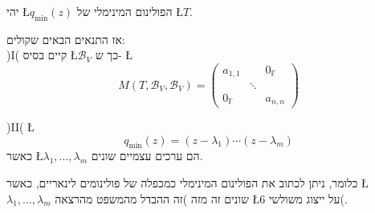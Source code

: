 \documentclass[english,hebrew]{article}
\begin{document}
יהי \L{$q_{\min}(z)$} הפולינום המינימלי של \L{$T$}.

אז התנאים הבאים שקולים:\\

)I( קיים בסיס \L{$\mathcal{B}_{V}$} כך ש- \L{%
\[
M(T,\mathcal{B}_{V},\mathcal{B}_{V})=\begin{pmatrix}a_{1,1} &  & 0_{\mathbb{F}}\\
 & \ddots\\
0_{\mathbb{F}} &  & a_{n,n}
\end{pmatrix}
\]
}%

)II( \L{%
\[
q_{\min}(z)=(z-\lambda_{1})\cdots(z-\lambda_{m})
\]
}%
כאשר \L{$\lambda_{1},\dots,\lambda_{m}$} הם ערכים עצמיים שונים.

כלומר, ניתן לכתוב את הפולינום המינימלי כמכפלה של פולינומים לינאריים,
כאשר \L{$\lambda_{1},\dots,\lambda_{m}$} שונים זה מזה )זה ההבדל מהמשפט
מהרצאה \L{$6$} על ייצוג משולשי(.
\end{document}
